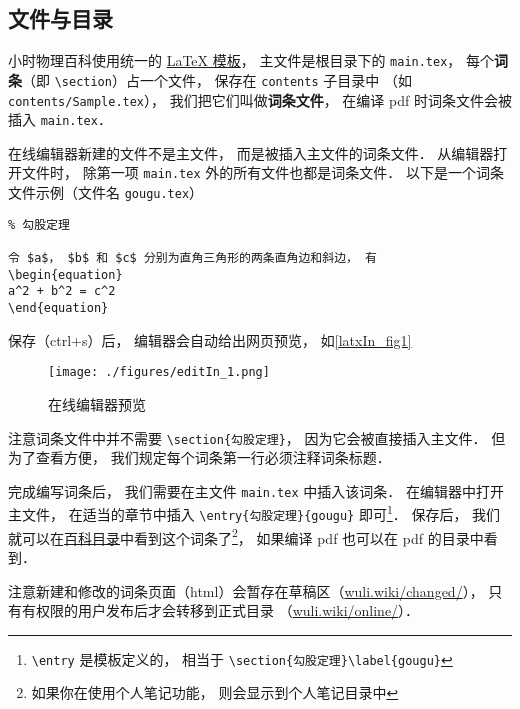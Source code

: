 

\subsection{文件与目录}

小时物理百科使用统一的 \href{https://github.com/MacroUniverse/PhysWiki}{LaTeX 模板}， 主文件是根目录下的 \lstinline|main.tex|， 每个\textbf{词条}（即 \lstinline|\section|）占一个文件， 保存在 \lstinline|contents| 子目录中 （如 \lstinline|contents/Sample.tex|）， 我们把它们叫做\textbf{词条文件}， 在编译 pdf 时词条文件会被插入 \lstinline|main.tex|．

在线编辑器新建的文件不是主文件， 而是被插入主文件的词条文件． 从编辑器打开文件时， 除第一项 \lstinline|main.tex| 外的所有文件也都是词条文件． 以下是一个词条文件示例（文件名 \lstinline|gougu.tex|）

\begin{lstlisting}
% 勾股定理

令 $a$， $b$ 和 $c$ 分别为直角三角形的两条直角边和斜边， 有
\begin{equation}
a^2 + b^2 = c^2
\end{equation}
\end{lstlisting}
保存（ctrl+s）后， 编辑器会自动给出网页预览， 如\autoref{latxIn_fig1}
\begin{figure}[ht]
\centering
\texttt{[image: ./figures/editIn\_1.png]}
\caption{在线编辑器预览} \label{editIn_fig1}
\end{figure}

注意词条文件中并不需要 \lstinline|\section{勾股定理}|， 因为它会被直接插入主文件． 但为了查看方便， 我们规定每个词条第一行必须注释词条标题．

完成编写词条后， 我们需要在主文件 \lstinline|main.tex| 中插入该词条． 在编辑器中打开主文件， 在适当的章节中插入 \lstinline|\entry{勾股定理}{gougu}| 即可\footnote{\lstinline|\entry| 是模板定义的， 相当于 \lstinline|\section{勾股定理}\label{gougu}|}． 保存后， 我们就可以在\href{http://wuli.wiki/changed}{百科目录}中看到这个词条了\footnote{如果你在使用个人笔记功能， 则会显示到个人笔记目录中}， 如果编译 pdf 也可以在 pdf 的目录中看到．

注意新建和修改的词条页面（html）会暂存在草稿区（\href{http://wuli.wiki/changed/}{wuli.wiki/changed/}）， 只有有权限的用户发布后才会转移到正式目录 （\href{http://wuli.wiki/online/}{wuli.wiki/online/}）．
